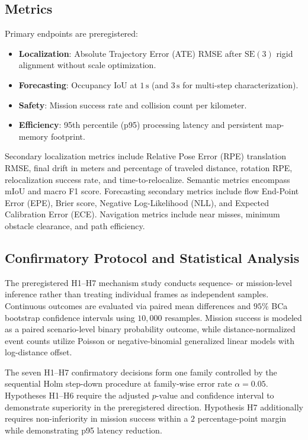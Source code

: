 \subsection{Metrics}
\label{subsec:metrics}

Primary endpoints are preregistered:
\begin{itemize}
  \item \textbf{Localization}: Absolute Trajectory Error (ATE) RMSE after $\mathrm{SE}(3)$ rigid alignment without scale optimization.
  \item \textbf{Forecasting}: Occupancy IoU at $1\,\text{s}$ (and $3\,\text{s}$ for multi-step characterization).
  \item \textbf{Safety}: Mission success rate and collision count per kilometer.
  \item \textbf{Efficiency}: 95th percentile (p95) processing latency and persistent map-memory footprint.
\end{itemize}

Secondary localization metrics include Relative Pose Error (RPE) translation RMSE, final drift in meters and percentage of traveled distance, rotation RPE, relocalization success rate, and time-to-relocalize. Semantic metrics encompass mIoU and macro F1 score. Forecasting secondary metrics include flow End-Point Error (EPE), Brier score, Negative Log-Likelihood (NLL), and Expected Calibration Error (ECE). Navigation metrics include near misses, minimum obstacle clearance, and path efficiency.

\subsection{Confirmatory Protocol and Statistical Analysis}
\label{subsec:statistical_analysis}

The preregistered H1--H7 mechanism study conducts sequence- or mission-level inference rather than treating individual frames as independent samples. Continuous outcomes are evaluated via paired mean differences and $95\%$ BCa bootstrap confidence intervals using $10{,}000$ resamples. Mission success is modeled as a paired scenario-level binary probability outcome, while distance-normalized event counts utilize Poisson or negative-binomial generalized linear models with log-distance offset.

The seven H1--H7 confirmatory decisions form one family controlled by the sequential Holm step-down procedure at family-wise error rate $\alpha = 0.05$. Hypotheses H1--H6 require the adjusted $p$-value and confidence interval to demonstrate superiority in the preregistered direction. Hypothesis H7 additionally requires non-inferiority in mission success within a $2$ percentage-point margin while demonstrating p95 latency reduction.
